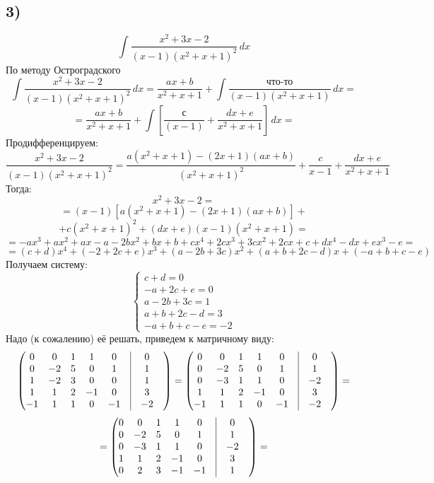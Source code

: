 \documentclass[a4paper,12pt]{article}
\begin{document}
\subsection*{3)}
\[
\int \frac{x^2 + 3x -2}{(x-1)(x^2+x+1)^2} \, dx
\]
По методу Остроградского
\[
\int \frac{x^2 + 3x -2}{(x-1)(x^2+x+1)^2} \, dx = \frac{ax+b}{x^2+x+1} + \int \frac{\text{что-то}}{(x-1)(x^2+x+1)} \,dx =
\]
\[
=
 \frac{ax+b}{x^2+x+1} + \int  \left[ \frac{\text{с}}{(x-1)}  + \frac{dx + e}{x^2+x+1} \right] \,dx = 
\]
Продифференцируем:
\[
\frac{x^2+3x-2}{(x-1)(x^2+x+1)^2} = \frac{a(x^2+x+1) -(2x+1)(ax+b)}{(x^2+x+1)^2} + \frac{c}{x-1} + \frac{dx+e}{x^2+x+1}
\]
Тогда:
\[
x^2 +3x -2 =
\]
\[
=
 (x-1)\left[ a(x^2+x+1) - (2x+1)(ax+b) \right]  + 
\]
\[
+ c(x^2 + x +1)^2 + (dx+e)(x-1)(x^2+x+1) = 
\]
\[
= 
-ax^3 + ax^2 + ax - a - 2bx^2 + bx + b + cx^4 + 2cx^3 + 3cx^2 + 2cx + c + dx^4 -dx + ex^3 - e = 
\]
\[
= 
(c+d)x^4 + (-2+2c+e)x^3 + (a-2b+3c)x^2 + (a +b + 2c -d)x + (-a + b + c - e) 
\]
Получаем систему:
\[
\begin{cases}
c  + d = 0 \\ 
-a + 2c + e = 0 \\
a -2b + 3c = 1 \\
a + b + 2c - d = 3\\
-a + b + c - e = -2
\end{cases}
\]
Надо (к сожалению) её решать, приведем к матричному виду:
\[
\begin{pmatrix}
0 & 0 & 1 & 1 & 0 & \vrule &0 & \\
0 & -2 & 5 & 0 & 1 & \vrule &1 & \\
1 & -2 & 3 & 0 & 0 & \vrule &1 & \\
1 & 1 & 2 & -1 & 0 & \vrule &3 & \\
-1 & 1 & 1 & 0 & -1 & \vrule &-2 & \\
\end{pmatrix}
=
\begin{pmatrix}
0 & 0 & 1 & 1 & 0 & \vrule &0 & \\
0 & -2 & 5 & 0 & 1 & \vrule &1 & \\
0 & -3 & 1 & 1 & 0 & \vrule &-2 & \\
1 & 1 & 2 & -1 & 0 & \vrule &3 & \\
-1 & 1 & 1 & 0 & -1 & \vrule &-2 & \\
\end{pmatrix}
=
\]
\[
=
\begin{pmatrix}
0 & 0 & 1 & 1 & 0 & \vrule &0 & \\
0 & -2 & 5 & 0 & 1 & \vrule &1 & \\
0 & -3 & 1 & 1 & 0 & \vrule &-2 & \\
1 & 1 & 2 & -1 & 0 & \vrule &3 & \\
0 & 2 & 3 & -1 & -1 & \vrule &1 & \\
\end{pmatrix}
=
\]
\end{document}
